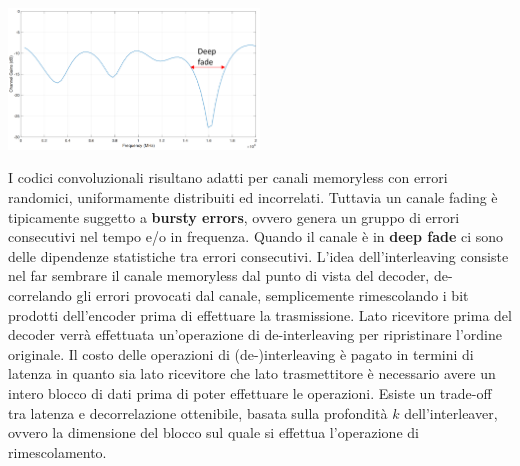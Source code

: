 \begin{center}
\end{center}
\begin{center}
    \includegraphics[width=0.5\textwidth]{imgs/deep_fade.png}
\end{center}

I codici convoluzionali risultano adatti per canali memoryless con errori randomici, uniformamente distribuiti ed incorrelati. 
Tuttavia un canale fading è tipicamente suggetto a \textbf{bursty errors}, ovvero genera un gruppo di errori consecutivi nel tempo e/o in frequenza. 
Quando il canale è in \textbf{deep fade} ci sono delle dipendenze statistiche tra errori consecutivi.
L'idea dell'interleaving consiste nel far sembrare il canale memoryless dal punto di vista del decoder, de-correlando gli errori provocati dal canale, semplicemente rimescolando i bit prodotti dell'encoder prima di effettuare la trasmissione.
Lato ricevitore prima del decoder verrà effettuata un'operazione di de-interleaving per ripristinare l'ordine originale.
Il costo delle operazioni di (de-)interleaving è pagato in termini di latenza in quanto sia lato ricevitore che lato trasmettitore è necessario avere un intero blocco di dati prima di poter effettuare le operazioni. 
Esiste un trade-off tra latenza e decorrelazione ottenibile, basata sulla profondità $k$ dell'interleaver, ovvero la dimensione del blocco sul quale si effettua l'operazione di rimescolamento.

